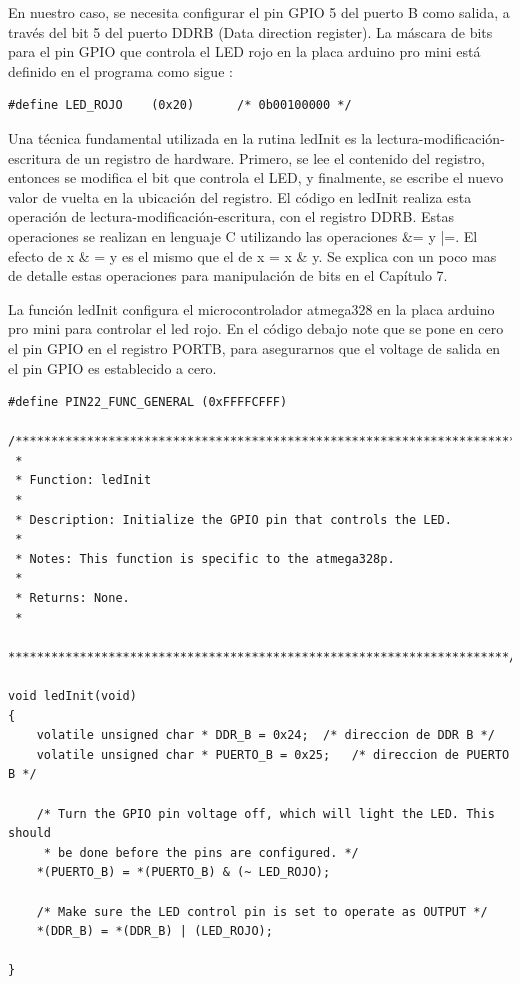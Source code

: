 \documentclass[12pt]{article}
\begin{document}
En nuestro caso, se necesita configurar el pin GPIO 5 del puerto B como 
salida, a través del bit 5 del puerto DDRB (Data direction register).
La máscara de bits para el pin GPIO que controla el LED rojo en la
placa arduino pro mini está definido en el programa como sigue :

\begin{verbatim}
#define LED_ROJO	(0x20)		/* 0b00100000 */
\end{verbatim}

Una técnica fundamental utilizada en la rutina ledInit es la lectura-modificación-escritura de un registro de hardware.
Primero, se lee el contenido del registro, entonces se modifica el bit que controla el LED, y finalmente, se escribe el nuevo valor de vuelta en la ubicación
del registro.
El código en ledInit realiza esta operación de lectura-modificación-escritura,
con el registro DDRB. Estas operaciones se realizan en lenguaje C utilizando
las operaciones \&= y |=. El efecto de x \& = y es el mismo que el de
x = x \& y. Se explica con un poco mas de detalle estas operaciones para manipulación
de bits en el Capítulo 7.

La función ledInit configura el microcontrolador atmega328 en la placa
arduino pro mini para controlar el led rojo.
En el código debajo note que se pone en cero el pin GPIO en el registro
PORTB, para asegurarnos que el voltage de salida en el pin GPIO es 
establecido a cero.


\begin{verbatim}
#define PIN22_FUNC_GENERAL (0xFFFFCFFF)

/**********************************************************************
 *
 * Function: ledInit
 *
 * Description: Initialize the GPIO pin that controls the LED.
 *
 * Notes: This function is specific to the atmega328p.
 *
 * Returns: None.
 *
 **********************************************************************/

void ledInit(void)
{
    volatile unsigned char * DDR_B = 0x24;	/* direccion de DDR B */
    volatile unsigned char * PUERTO_B = 0x25;	/* direccion de PUERTO B */

    /* Turn the GPIO pin voltage off, which will light the LED. This should
     * be done before the pins are configured. */
    *(PUERTO_B) = *(PUERTO_B) & (~ LED_ROJO);

    /* Make sure the LED control pin is set to operate as OUTPUT */
    *(DDR_B) = *(DDR_B) | (LED_ROJO);

}
\end{verbatim}
\end{document}
